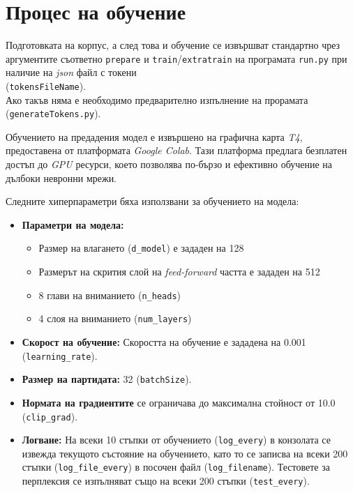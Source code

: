 \documentclass[12pt,oneside,a4paper]{article}
\begin{document}
	\printbibliography
	
	
	\section{Процес на обучение}
	
	Подготовката на корпус, а след това и обучение се извършват стандартно чрез аргументите съответно \texttt{prepare} и \texttt{train}/\texttt{extratrain} на програмата \texttt{run.py} при наличие на \textit{json} файл с токени\\ (\texttt{tokensFileName}).\\ Ако такъв няма е необходимо предварително изпълнение на прорамата (\texttt{generateTokens.py}).
	
	Обучението на предадения модел е извършено на графична карта \textit{T4}, предоставена от платформата \textit{Google Colab}. Тази платформа предлага безплатен достъп до \textit{GPU} ресурси, което позволява по-бързо и ефективно обучение на дълбоки невронни мрежи.

	
	Следните хиперпараметри бяха използвани за обучението на модела:
	
	\begin{itemize}
		\item \textbf{Параметри на модела:}
		\begin{itemize}
			\item Размер на влагането (\texttt{d\_model}) е зададен на 128
			\item Размерът на скрития слой на \textit{feed-forward} частта е зададен на 512
			\item 8 глави на вниманието (\texttt{n\_heads})
			\item 4 слоя на вниманието (\texttt{num\_layers})
		\end{itemize}
		\item \textbf{Скорост на обучение:} Скоростта на обучение е зададена на 0.001 (\texttt{learning\_rate}).
		\item \textbf{Размер на партидата:} 32 (\texttt{batchSize}).
		\item \textbf{Нормата на градиентите} се ограничава до максимална стойност от 10.0 (\texttt{clip\_grad}).
		\item \textbf{Логване:} На всеки 10 стъпки от обучението (\texttt{log\_every}) в конзолата се извежда текущото състояние на обучението, като то се записва на всеки 200 стъпки (\texttt{log\_file\_every}) в посочен файл (\texttt{log\_filename}). Тестовете за перплексия се изпълняват също на всеки 200 стъпки (\texttt{test\_every}).
	\end{itemize}
	
\end{document}
